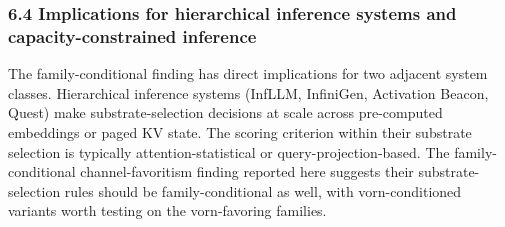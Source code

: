 \documentclass[
]{article}
\begin{document}
\subsubsection{6.4 Implications for hierarchical inference systems and
capacity-constrained
inference}\label{64-implications-for-hierarchical-inference-systems-and-capacity-constrained-inference}

The family-conditional finding has direct implications for two adjacent
system classes. Hierarchical inference systems (InfLLM, InfiniGen,
Activation Beacon, Quest) make substrate-selection decisions at scale
across pre-computed embeddings or paged KV state. The scoring criterion
within their substrate selection is typically attention-statistical or
query-projection-based. The family-conditional channel-favoritism
finding reported here suggests their substrate-selection rules should be
family-conditional as well, with vorn-conditioned variants
worth testing on the vorn-favoring families.
\end{document}
